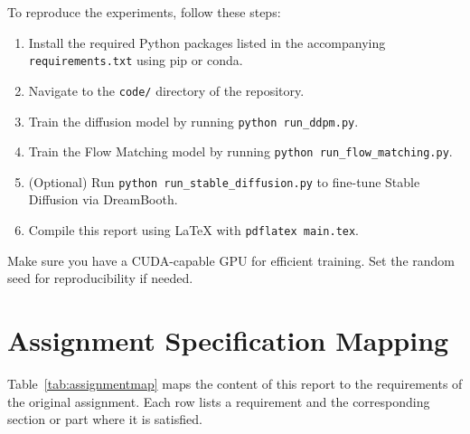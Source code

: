 To reproduce the experiments, follow these steps:

\begin{enumerate}[label=\arabic*., leftmargin=2em]
  \item Install the required Python packages listed in the
    accompanying \texttt{requirements.txt} using pip or conda.
  \item Navigate to the \texttt{code/} directory of the repository.
  \item Train the diffusion model by running \texttt{python run\_ddpm.py}.
  \item Train the Flow Matching model by running
    \texttt{python run\_flow\_matching.py}.
  \item (Optional) Run \texttt{python run\_stable\_diffusion.py} to
    fine-tune Stable Diffusion via DreamBooth.
  \item Compile this report using \LaTeX{} with
    \texttt{pdflatex main.tex}.
\end{enumerate}

Make sure you have a CUDA-capable GPU for efficient training.  Set the
random seed for reproducibility if needed.

\section{Assignment Specification Mapping}

Table~\ref{tab:assignmentmap} maps the content of this report to the
requirements of the original assignment.  Each row lists a requirement
and the corresponding section or part where it is satisfied.

